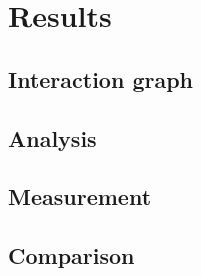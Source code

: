 \chapter{Results} \label{ch:results}


\section{Interaction graph}
\section{Analysis}
\section{Measurement}
\section{Comparison}

